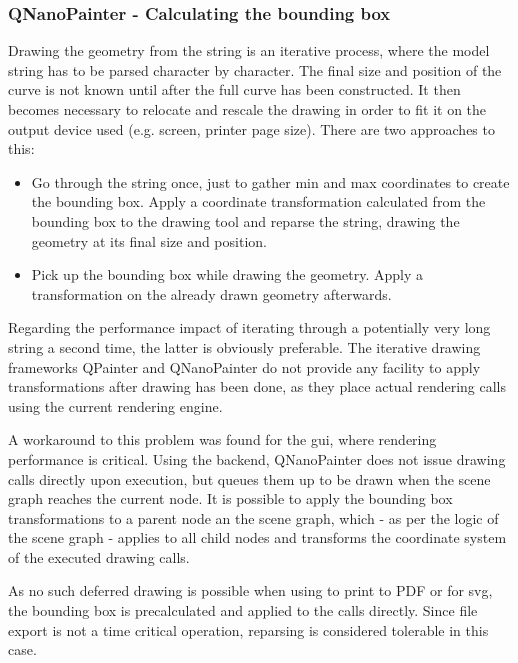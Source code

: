 \subsubsection{QNanoPainter - Calculating the \gls{bounding box}}\label{sec:bbcalc}
Drawing the geometry from the string is an iterative process, where the model string has to be parsed character by character. The final size and position of the curve is not known until after the full curve has been constructed.
It then becomes necessary to relocate and rescale the drawing in order to fit it on the output device used  (e.g. screen, printer page size). There are two approaches to this:
\begin{itemize}
	\item Go through the string once, just to gather min and max coordinates to create the bounding box. Apply a coordinate transformation calculated from the bounding box to the drawing tool and reparse the string, drawing the geometry at its final size and position.
	\item Pick up the bounding box while drawing the geometry. Apply a transformation on the already drawn geometry afterwards.
\end{itemize}
Regarding the performance impact of iterating through a potentially very long string a second time, the latter is obviously preferable. The iterative drawing frameworks QPainter and QNanoPainter do not provide any facility to apply transformations after drawing has been done, as they place actual rendering calls using the current rendering engine.

A workaround to this problem was found for the \gls{gui}, where rendering performance is critical. Using the  backend, QNanoPainter does not issue drawing calls directly upon execution, but queues them up to be drawn when the scene graph reaches the current node. It is possible to apply the bounding box transformations to a parent node an the scene graph, which - as per the logic of the scene graph - applies to all child nodes and transforms the coordinate system of the executed drawing calls.

As no such deferred drawing is possible when using  to print to PDF or  for \gls{svg}, the bounding box is precalculated and applied to the calls directly. Since file export is not a time critical operation, reparsing is considered tolerable in this case.

